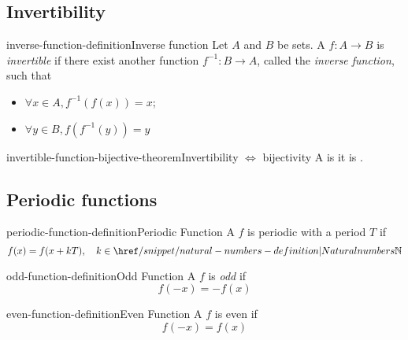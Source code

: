 \documentclass[preview]{standalone}
\begin{document}
\subsection{Invertibility}

\begin{snippetdefinition}{inverse-function-definition}{Inverse function}
    Let \(A\) and \(B\) be sets. A \function \(f\colon A \to B\) is \textit{invertible}
    if there exist another function \(f^{-1}\colon B \to A\), called the \textit{inverse function},
    such that
    \begin{itemize}
        \item \(\forall x \in A, f^{-1}(f(x)) = x\);
        \item \(\forall y \in B, f(f^{-1}(y)) = y\)
    \end{itemize}
\end{snippetdefinition}

\begin{snippettheorem}{invertible-function-bijective-theorem}{Invertibility \(\iff\) bijectivity}
    A \function is 
    \ifandonlyif it is .
\end{snippettheorem}

\subsection{Periodic functions}

\begin{snippetdefinition}{periodic-function-definition}{Periodic Function}
    A \function \(f\) is periodic with a period \(T\) if
    \[
        f(x) = f(x + kT), \quad k \in \naturalnumbers
    \]
\end{snippetdefinition}

\begin{snippetdefinition}{odd-function-definition}{Odd Function}
    A \function \(f\) is \textit{odd} if
    \[
        f(-x) = -f(x)
    \]
\end{snippetdefinition}

\begin{snippetdefinition}{even-function-definition}{Even Function}
    A \function \(f\) is even if
    \[
        f(-x) = f(x)
    \]
\end{snippetdefinition}
\end{document}
